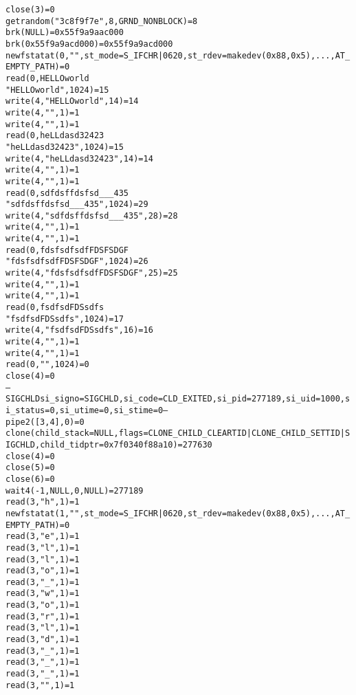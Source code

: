 \documentclass[pdf, unicode, 12pt, a4paper,oneside,fleqn]{article}
\begin{document}
\begin{alltt}
close(3)                                = 0
getrandom("\x3c\x8f\x9f\x7e\xfd", 8, GRND_NONBLOCK) = 8
brk(NULL)                               = 0x55f9a9aac000
brk(0x55f9a9acd000)                     = 0x55f9a9acd000
newfstatat(0, "", {st_mode=S_IFCHR|0620, st_rdev=makedev(0x88, 0x5), ...}, AT_EMPTY_PATH) = 0
read(0, HELLO world   
"HELLO world   \n", 1024)       = 15
write(4, "HELLO world   ", 14)          = 14
write(4, "\n", 1)                       = 1
write(4, "", 1)                      = 1
read(0, heLLdasd 32423
"heLLdasd 32423\n", 1024)       = 15
write(4, "heLLdasd 32423", 14)          = 14
write(4, "\n", 1)                       = 1
write(4, "", 1)                      = 1
read(0, sdfdsf  fdsfsd        ___435
"sdfdsf  fdsfsd        ___435\n", 1024) = 29
write(4, "sdfdsf  fdsfsd        ___435", 28) = 28
write(4, "\n", 1)                       = 1
write(4, "", 1)                      = 1
read(0, fdsfsdfsdf   FDSFSDGF    
"fdsfsdfsdf   FDSFSDGF    \n", 1024) = 26
write(4, "fdsfsdfsdf   FDSFSDGF    ", 25) = 25
write(4, "\n", 1)                       = 1
write(4, "", 1)                      = 1
read(0, fsdfsd   FDSsdfs
"fsdfsd   FDSsdfs\n", 1024)     = 17
write(4, "fsdfsd   FDSsdfs", 16)        = 16
write(4, "\n", 1)                       = 1
write(4, "", 1)                      = 1
read(0, "", 1024)                       = 0
close(4)                                = 0
--- SIGCHLD {si_signo=SIGCHLD, si_code=CLD_EXITED, si_pid=277189, si_uid=1000, si_status=0, si_utime=0, si_stime=0} ---
pipe2([3, 4], 0)                        = 0
clone(child_stack=NULL, flags=CLONE_CHILD_CLEARTID|CLONE_CHILD_SETTID|SIGCHLD, child_tidptr=0x7f0340f88a10) = 277630
close(4)                                = 0
close(5)                                = 0
close(6)                                = 0
wait4(-1, NULL, 0, NULL)                = 277189
read(3, "h", 1)                         = 1
newfstatat(1, "", {st_mode=S_IFCHR|0620, st_rdev=makedev(0x88, 0x5), ...}, AT_EMPTY_PATH) = 0
read(3, "e", 1)                         = 1
read(3, "l", 1)                         = 1
read(3, "l", 1)                         = 1
read(3, "o", 1)                         = 1
read(3, "_", 1)                         = 1
read(3, "w", 1)                         = 1
read(3, "o", 1)                         = 1
read(3, "r", 1)                         = 1
read(3, "l", 1)                         = 1
read(3, "d", 1)                         = 1
read(3, "_", 1)                         = 1
read(3, "_", 1)                         = 1
read(3, "_", 1)                         = 1
read(3, "\n", 1)                        = 1

\end{alltt}
\end{document}

